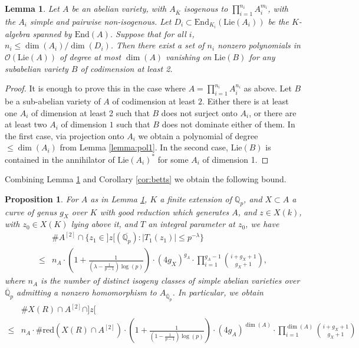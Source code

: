 \documentclass[11pt]{amsart}
\def\Q{\mathbb Q}
\newcommand{\Lie}{\mathrm{Lie}}
\newcommand{\End}{\mathrm{End}}
\theoremstyle{plain}
\newtheorem{lemma}{Lemma}
\newtheorem{proposition}{Proposition}
\theoremstyle{definition}
\newcommand{\red}{\mathrm{red}}
\begin{document}
\begin{lemma}\label{lemma:pol2}
Let $A$ be an abelian variety, with $A_{\overline{K}}$  isogenous to $\prod _{i=1}^{n_i} A_i ^{m_i}$, with the $A_i$ simple and pairwise non-isogenous. Let $D_i \subset \End _{K_i }(\Lie (A_i ))$ be the $K$-algebra spanned by $\End (A)$. Suppose that for all $i$, $n_i \leq \dim (A_i )/\dim (D_i )$. Then there exist a set of $n_i$ nonzero polynomials in $\mathcal{O}(\Lie (A))$ of degree at most $\dim (A)$ vanishing on $\Lie (B)$ for any subabelian variety $B$ of codimension at least 2. 
\end{lemma}
\begin{proof}
It is enough to prove this in the case where $A=\prod _{i=1}^{n_i} A_i ^{n_i }$ as above. Let $B$ be a sub-abelian variety of $A$ of codimension at least $2$. Either there is at least one $A_i$ of dimension at least 2 such that $B$ does not surject onto $A_i$, or there are at least two $A_i$ of dimension $1$ such that $B$ does not dominate either of them. In the first case, via projection onto $A_i$ we obtain a polynomial of degree $\leq \dim (A_i )$ from Lemma \ref{lemma:pol1}. In the second case, $\Lie (B)$ is contained in the annihilator of $\Lie (A_i )^*$ for some $A_i$ of dimension 1.
\end{proof}

Combining Lemma \ref{lemma:pol2} and Corollary \ref{cor:betts} we obtain the following bound.
\begin{proposition}\label{prop:final_bound}
For $A$ as in Lemma \ref{lemma:pol2}, $K$ a finite extension of $\Q _p$, and $X\subset A$ a curve of genus $g_X $ over $K$ with good reduction which generates $A$, and $z\in X(k)$, with $z_0 \in X(K)$ lying above it, and $T$ an integral parameter at $z_0$, we have
\begin{align*} 
& \# A^{[2]}\cap \{ z_1 \in ]z[(\overline{\Q _p }):|T_1 (z_1 )| \leq   p^{-\lambda } \} \\
 \leq & n_A \cdot \left( 1+\frac{1}{(\lambda -\frac{1}{p-1})\log (p)}\right) \cdot (4g_X )^{g_A} \cdot\prod_{i=1}^{g_A-1}\binom{i+g_X+1}{g_X+1},
\end{align*}
where $n_A$ is the number of distinct isogeny classes of simple abelian varieties over $\overline{\Q }_p $ admitting a nonzero homomorphism to $A_{\overline{\Q }_p }$.
In particular, we obtain
\begin{align*} 
& \# X(R) \cap A^{[2]}\cap ]z[  \\ 
\leq &  n_A \cdot \# \red (X(R)\cap A^{[2]}) \cdot \left( 1+\frac{1}{(1 -\frac{1}{p-1})\log (p)}\right) \cdot (4g_A )^{\dim (A)}\cdot \prod _{i=1}^{\dim (A)} \binom{i+g_X +1}{g_X +1}
\end{align*}
\end{proposition}
\end{document}
